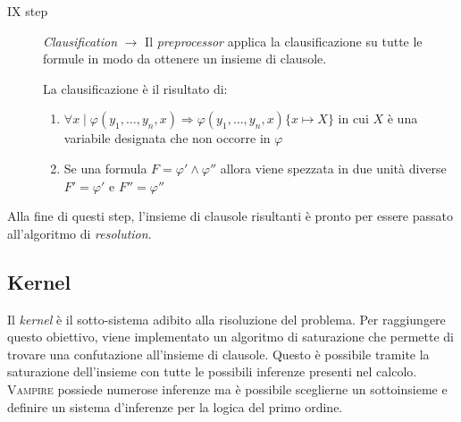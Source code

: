 \begin{description}
\begin{definition}
    \end{definition}
    \item[IX step] \emph{Clausification} $\longrightarrow$ Il \emph{preprocessor} applica la clausificazione su tutte le formule in modo da ottenere 
    un insieme di clausole.
    \begin{definition}
        La clausificazione è il risultato di:
        \begin{enumerate}
            \item $\forall x\mid\varphi(y_1,\dots,y_n,x)\Rightarrow\varphi(y_1,\dots,y_n,x)\{x \mapsto X\}$  in cui $X$ è una variabile designata che non occorre in $\varphi$
            \item Se una formula $F=\varphi'\land\varphi''$ allora viene spezzata in due unità diverse 
            $F'=\varphi'$ e $F''=\varphi''$
        \end{enumerate}
    \end{definition}  
\end{description} 
Alla fine di questi step, l'insieme di clausole risultanti è pronto per essere passato all'algoritmo di \emph{resolution}.
\subsection{Kernel}
Il \emph{kernel} è il sotto-sistema adibito alla risoluzione del problema. Per raggiungere questo obiettivo, 
viene implementato un algoritmo di saturazione che permette di trovare una confutazione all'insieme di clausole.
Questo è possibile tramite la saturazione dell'insieme con tutte le possibili inferenze presenti nel calcolo. 
\textsc{Vampire} possiede numerose inferenze ma è possibile sceglierne un sottoinsieme e definire un sistema 
d'inferenze per la logica del primo ordine.


